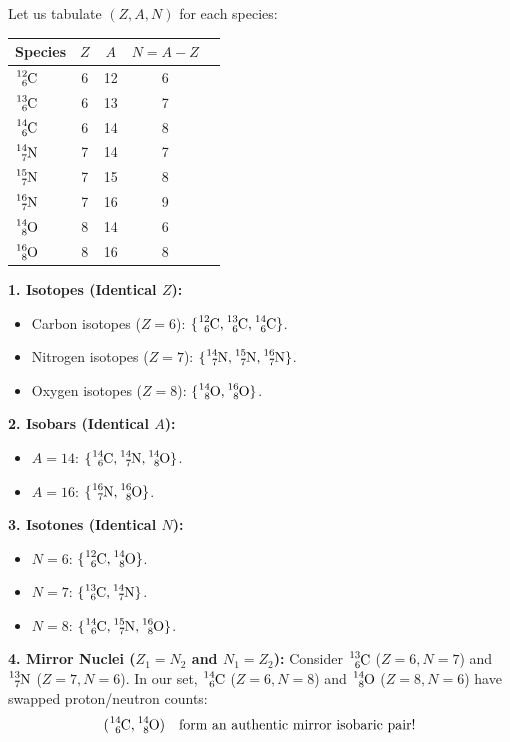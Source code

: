 \begin{solution}
Let us tabulate $(Z, A, N)$ for each species:
\begin{center}
\begin{tabular}{lcccc}
\toprule
Species & $Z$ & $A$ & $N = A - Z$ \\
\midrule
$\ce{^{12}_{6}C}$ & 6 & 12 & 6 \\
$\ce{^{13}_{6}C}$ & 6 & 13 & 7 \\
$\ce{^{14}_{6}C}$ & 6 & 14 & 8 \\
$\ce{^{14}_{7}N}$ & 7 & 14 & 7 \\
$\ce{^{15}_{7}N}$ & 7 & 15 & 8 \\
$\ce{^{16}_{7}N}$ & 7 & 16 & 9 \\
$\ce{^{14}_{8}O}$ & 8 & 14 & 6 \\
$\ce{^{16}_{8}O}$ & 8 & 16 & 8 \\
\bottomrule
\end{tabular}
\end{center}

\textbf{1. Isotopes (Identical $Z$):}
\begin{itemize}[itemsep=1pt]
  \item Carbon isotopes ($Z=6$): $\{\ce{^{12}_{6}C}, \ce{^{13}_{6}C}, \ce{^{14}_{6}C}\}$.
  \item Nitrogen isotopes ($Z=7$): $\{\ce{^{14}_{7}N}, \ce{^{15}_{7}N}, \ce{^{16}_{7}N}\}$.
  \item Oxygen isotopes ($Z=8$): $\{\ce{^{14}_{8}O}, \ce{^{16}_{8}O}\}$.
\end{itemize}

\textbf{2. Isobars (Identical $A$):}
\begin{itemize}[itemsep=1pt]
  \item $A = 14$: $\{\ce{^{14}_{6}C}, \ce{^{14}_{7}N}, \ce{^{14}_{8}O}\}$.
  \item $A = 16$: $\{\ce{^{16}_{7}N}, \ce{^{16}_{8}O}\}$.
\end{itemize}

\textbf{3. Isotones (Identical $N$):}
\begin{itemize}[itemsep=1pt]
  \item $N = 6$: $\{\ce{^{12}_{6}C}, \ce{^{14}_{8}O}\}$.
  \item $N = 7$: $\{\ce{^{13}_{6}C}, \ce{^{14}_{7}N}\}$.
  \item $N = 8$: $\{\ce{^{14}_{6}C}, \ce{^{15}_{7}N}, \ce{^{16}_{8}O}\}$.
\end{itemize}

\textbf{4. Mirror Nuclei ($Z_1 = N_2$ and $N_1 = Z_2$):}
Consider $\ce{^{13}_{6}C}$ ($Z=6, N=7$) and $\ce{^{13}_{7}N}$ ($Z=7, N=6$). In our set, $\ce{^{14}_{6}C}$ ($Z=6, N=8$) and $\ce{^{14}_{8}O}$ ($Z=8, N=6$) have swapped proton/neutron counts:
\[
(\ce{^{14}_{6}C}, \ce{^{14}_{8}O}) \quad \text{form an authentic mirror isobaric pair!}
\]
\end{solution}

